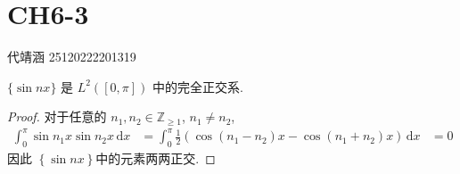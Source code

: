 \documentclass[../main.tex]{subfiles}
\begin{document}
\ifSubfilesClassLoaded{

    
    \setcounter{chapter}{5}
}{}

\chapter{ CH6-3 }
 代靖涵 25120222201319
\begin{exercise}{}{}
$\{\sin nx\}$ 是 $L^2([0, \pi])$ 中的完全正交系.
\end{exercise}

\begin{proof}
    对于任意的 \(  n_1,n_2\in \mathbb{Z} _{\ge 1}  \), \(  n_1\neq n_2  \),  \[
   \begin{aligned}
    \int_{0}^{ \pi } \sin n_1x\sin n_2x\,\mathrm{d} x&=\int_{0}^{ \pi }\frac{1}{2}\left( \cos \left( n_1-n_2 \right)x-\cos \left( n_1+ n_2 \right)x   \right)\,\mathrm{d} x 
     &=0 
   \end{aligned}
    \]  因此 \(  \left\{ \sin nx \right\}  \)中的元素两两正交.
    

\end{proof}
\end{document}
